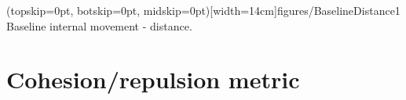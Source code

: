 \documentclass{ieeeaccess}
\begin{document}
\Figure[t!](topskip=0pt, botskip=0pt,
midskip=0pt)[width=14cm]{figures/BaselineDistance1} {Baseline internal movement
- distance.\label{coord:BaselineDistance1}}


\section{Cohesion/repulsion metric}\label{Section:MagnitudeDynamics}


\end{document}

